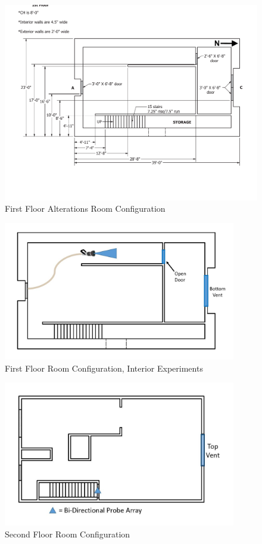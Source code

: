 \documentclass{article}
\begin{document}
\begin{figure}[!ht]
	\centering
	\includegraphics[width=6in]{Figures/Air_Entrainment/West_Test_Structure_1st_Floor_nodim.pdf}
	\caption{First Floor Alterations Room Configuration}
	\label{fig:First_Floor_Alterations_Room_Configuration}
\end{figure}

\clearpage

\begin{figure}[!ht]
	\centering
	\includegraphics[width=4in]{Figures/Air_Entrainment/Measurement_Location_Room_Configuration_Bottom.jpg}
	\caption{First Floor Room Configuration, Interior Experiments}
	\label{fig:First_Floor_Room_Configuration_Interior_Experiments}
\end{figure}

\begin{figure}[!ht]
	\centering
	\includegraphics[width=4in]{Figures/Air_Entrainment/Measurement_Location_VentConfig_Top.jpg}
	\caption{Second Floor Room Configuration}
	\label{fig:Second_Floor_Room_Configuration}
\end{figure}
\end{document}
